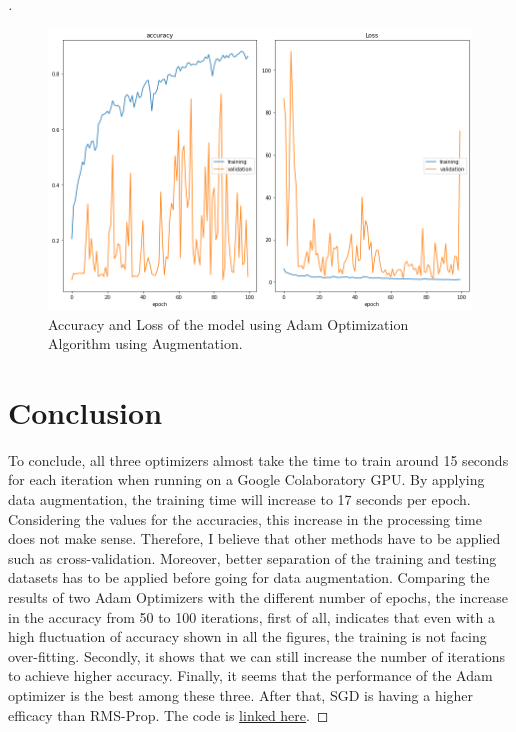 \documentclass[12pt,oneside,geqno]{article}
\begin{document}
\begin{proof}[\color{red}{Solution}]
		\begin{figure}
			\centering
			\includegraphics[width=\textwidth]{../figs/adam_aug_acc_loss_100.png}
			\caption{Accuracy and Loss of the model using Adam Optimization Algorithm using Augmentation.}
			\label{img:adam_aug_100}
		\end{figure}
		
		\section{Conclusion}
		
		To conclude, all three optimizers almost take the time to train around 15 seconds for each iteration when running on a Google Colaboratory GPU. By applying data augmentation, the training time will increase to 17 seconds per epoch. Considering the values for the accuracies, this increase in the processing time does not make sense. Therefore, I believe that other methods have to be applied such as cross-validation. Moreover, better separation of the training and testing datasets has to be applied before going for data augmentation. 
		Comparing the results of two Adam Optimizers with the different number of epochs, the increase in the accuracy from 50 to 100 iterations, first of all, indicates that even with a high fluctuation of accuracy shown in all the figures, the training is not facing over-fitting. Secondly, it shows that we can still increase the number of iterations to achieve higher accuracy. 
		Finally, it seems that the performance of the Adam optimizer is the best among these three. After that, SGD is having a higher efficacy than RMS-Prop.
		The code is \href{https://colab.research.google.com/drive/1vs7KYJjMphoGcK-9g3tKnQ49ZFdIiYI5#scrollTo=p_ujrM0L4yR9}{linked here}.
		
		
		
	\end{proof}
	
\end{document}
